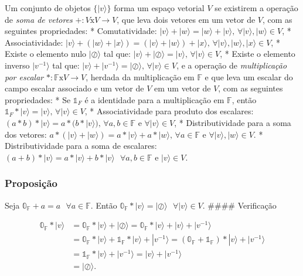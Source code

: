 \documentclass[11pt]{article}
\begin{document}
Um conjunto de objetos \(\{|v\rangle\}\) forma um espaço vetorial \(V\)
se existirem a operação de \emph{soma de vetores}
\(+:V\text{x}V\rightarrow V\), que leva dois vetores em um vetor de
\(V\), com as seguintes propriedades: * Comutatividade:
\(|v\rangle+|w\rangle=|w\rangle+|v\rangle\text{, }\forall|v\rangle,|w\rangle\in V\),
* Associatividade:
\(|v\rangle+(|w\rangle+|x\rangle)=(|v\rangle+|w\rangle)+|x\rangle\text{, }\forall|v\rangle,|w\rangle,|x\rangle\in V\),
* Existe o elemento nulo \(|\oslash\rangle\) tal que:
\(|v\rangle+|\oslash\rangle=|v\rangle\text{, }\forall|v\rangle\in V\), *
Existe o elemento inverso \(|v^{-1}\rangle\) tal que:
\(|v\rangle+|v^{-1}\rangle=|\oslash\rangle\text{, }\forall|v\rangle\in V\),
e a operação de \emph{multiplicação por escalar}
\(*:\mathbb{F}\text{x}V\rightarrow V\), herdada da multiplicação em
\(\mathbb{F}\) e que leva um escalar do campo escalar associado e um
vetor de \(V\) em um vetor de \(V\), com as seguintes propriedades: * Se
\(\mathbb{1}_{F}\) é a identidade para a multiplicação em
\(\mathbb{F}\), então
\(\mathbb{1}_{F}*|v\rangle=|v\rangle\text{, }\forall|v\rangle\in V\), *
Associatividade para produto dos escalares:
\((a*b)*|v\rangle=a*(b*|v\rangle)\text{, }\forall a,b\in\mathbb{F}\text{ e }\forall|v\rangle\in V\),
* Distributividade para a soma dos vetores:
\(a*(|v\rangle+|w\rangle)=a*|v\rangle+a*|w\rangle\text{, }\forall a\in\mathbb{F}\text{ e }\forall|v\rangle,|w\rangle\in V\).
* Distributividade para a soma de escalares:
\((a+b)*|v\rangle = a*|v\rangle+b*|v\rangle\text{ }\forall a,b\in\mathbb{F}\text{ e }|v\rangle\in V\).

    \subsubsection{Proposição}\label{proposiuxe7uxe3o}

Seja \(\mathbb{0}_{\mathbb{F}}+a=a\text{ }\forall a\in \mathbb{F}\).
Então
\(\mathbb{0}_{\mathbb{F}}*|v\rangle=|\oslash\rangle\text{ }\forall|v\rangle\in V\).
\#\#\#\# Verificação

\begin{align}
\mathbb{0}_{\mathbb{F}}*|v\rangle & = \mathbb{0}_{\mathbb{F}}*|v\rangle+|\oslash\rangle = \mathbb{0}_{\mathbb{F}}*|v\rangle+|v\rangle+|v^{-1}\rangle \\
& = \mathbb{0}_{\mathbb{F}}*|v\rangle+\mathbb{1}_{\mathbb{F}}*|v\rangle+|v^{-1}\rangle 
= (\mathbb{0}_{\mathbb{F}}+\mathbb{1}_{\mathbb{F}})*|v\rangle+|v^{-1}\rangle \\ 
& = \mathbb{1}_{\mathbb{F}}*|v\rangle+|v^{-1}\rangle = |v\rangle+|v^{-1}\rangle \\
& = |\oslash\rangle.
\end{align}
\end{document}
